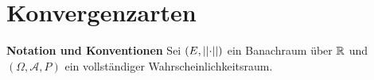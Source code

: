 \chapter{Konvergenzarten}
\textbf{Notation und Konventionen}\newline 
Sei $(E, \lvert\lvert \cdot \rvert\rvert)$ ein Banachraum über $\mathbb{R}$ und $(\Omega, \mathcal{A}, P)$ ein vollständiger Wahrscheinlichkeitsraum. 


